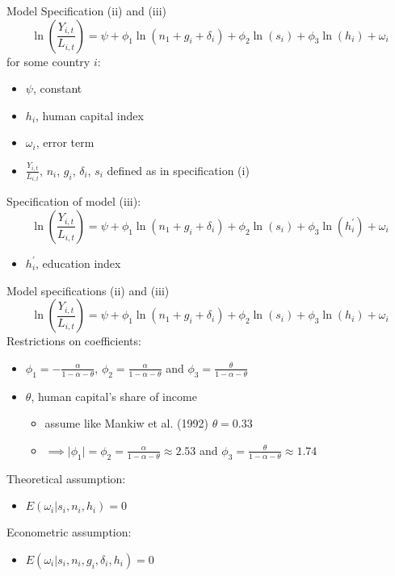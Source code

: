 \documentclass{beamer}
\begin{document}
\begin{frame}{Model Specification (ii) and (iii)}
	\begin{equation*}
		\ln \left ( \frac{Y_{i,t}}{L_{i,t}} \right ) = \psi + \phi_1 \ln (n_1 + g_i + \delta_i) + \phi_2 \ln(s_i) + \phi_3 \ln(h_i)+\omega_i
	\end{equation*}
	for some country $i$:
	\begin{itemize}
		\item $\psi$, constant
		\item $h_i$, human capital index
		\item $\omega_i$, error term
		\item $\frac{Y_{i,t}}{L_{i,t}}$, $n_i$, $g_i$, $\delta_i$, $s_i$ defined as in specification (i)
	\end{itemize}
Specification of model (iii):
	\begin{equation*}
	\ln \left ( \frac{Y_{i,t}}{L_{i,t}} \right ) = \psi + \phi_1 \ln (n_1 + g_i + \delta_i) + \phi_2 \ln(s_i) + \phi_3 \ln(h_i^\prime)+\omega_i
\end{equation*}
\begin{itemize}
	\item $h_i^\prime$, education index
\end{itemize}
\end{frame}

\begin{frame}{Model specifications (ii) and (iii)}
		\begin{equation*}
		\ln \left ( \frac{Y_{i,t}}{L_{i,t}} \right ) = \psi + \phi_1 \ln (n_1 + g_i + \delta_i) + \phi_2 \ln(s_i) + \phi_3 \ln(h_i)+\omega_i
	\end{equation*}
Restrictions on coefficients:
\begin{itemize}
	\item $\phi_1 = - \frac{\alpha}{1-\alpha-\theta}$, $\phi_2 = \frac{\alpha}{1-\alpha-\theta}$ and $\phi_3 = \frac{\theta}{1-\alpha-\theta}$
	\item $\theta$, human capital's share of income
	\begin{itemize}
		\item assume like Mankiw et al. (1992) $\theta = 0.33$
		\item $\implies \lvert \phi_1 \rvert = \phi_2 = \frac{\alpha}{1-\alpha-\theta} \approx 2.53$ and $\phi_3 = \frac{\theta}{1-\alpha - \theta} \approx 1.74$
	\end{itemize}
\end{itemize}
Theoretical assumption:
\begin{itemize}
	\item $E( \omega_i | s_i, n_i, h_i) =0$
\end{itemize}
Econometric assumption:
\begin{itemize}
	\item $E(\omega_i | s_i, n_i, g_i, \delta_i, h_i) = 0$
\end{itemize}
\end{frame}
\end{document}
